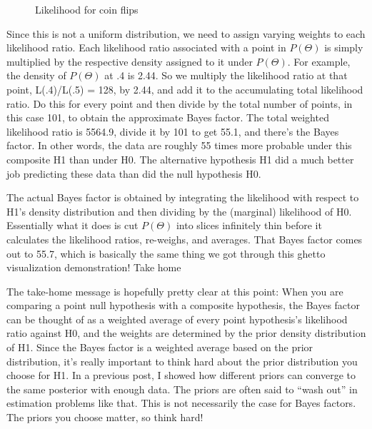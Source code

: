 \begin{figure}[h]
    \centering
    \caption{Likelihood for coin flips}
    \label{fig:p05c03-snip17}
\end{figure}



Since this is not a uniform distribution, we need to assign varying weights to each likelihood ratio. Each likelihood ratio associated with a point in $P(\Theta)$ is simply multiplied by the respective density assigned to it under $P(\Theta)$. For example, the density of $P(\Theta)$ at .4 is 2.44. So we multiply the likelihood ratio at that point, L(.4)/L(.5) = 128, by 2.44, and add it to the accumulating total likelihood ratio. Do this for every point and then divide by the total number of points, in this case 101, to obtain the approximate Bayes factor. The total weighted likelihood ratio is 5564.9, divide it by 101 to get 55.1, and there's the Bayes factor. In other words, the data are roughly 55 times more probable under this composite H1 than under H0. The alternative hypothesis H1 did a much better job predicting these data than did the null hypothesis H0.

The actual Bayes factor is obtained by integrating the likelihood with respect to H1's density distribution and then dividing by the (marginal) likelihood of H0. Essentially what it does is cut $P(\Theta)$ into slices infinitely thin before it calculates the likelihood ratios, re-weighs, and averages. That Bayes factor comes out to 55.7, which is basically the same thing we got through this ghetto visualization demonstration!
Take home

The take-home message is hopefully pretty clear at this point: When you are comparing a point null hypothesis with a composite hypothesis, the Bayes factor can be thought of as a weighted average of every point hypothesis's likelihood ratio against H0, and the weights are determined by the prior density distribution of H1. Since the Bayes factor is a weighted average based on the prior distribution, it's really important to think hard about the prior distribution you choose for H1. In a previous post, I showed how different priors can converge to the same posterior with enough data. The priors are often said to “wash out” in estimation problems like that. This is not necessarily the case for Bayes factors. The priors you choose matter, so think hard!


